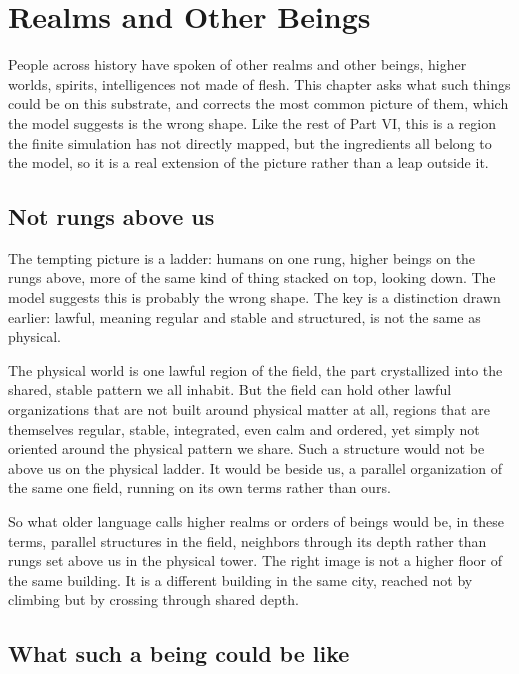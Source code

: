 \section{Realms and Other Beings}

People across history have spoken of other realms and other beings, higher worlds, spirits, intelligences not made of flesh. This chapter asks what such things could be on this substrate, and corrects the most common picture of them, which the model suggests is the wrong shape. Like the rest of Part VI, this is a region the finite simulation has not directly mapped, but the ingredients all belong to the model, so it is a real extension of the picture rather than a leap outside it.

\subsection{Not rungs above us}

The tempting picture is a ladder: humans on one rung, higher beings on the rungs above, more of the same kind of thing stacked on top, looking down. The model suggests this is probably the wrong shape. The key is a distinction drawn earlier: lawful, meaning regular and stable and structured, is not the same as physical.

The physical world is one lawful region of the field, the part crystallized into the shared, stable pattern we all inhabit. But the field can hold other lawful organizations that are not built around physical matter at all, regions that are themselves regular, stable, integrated, even calm and ordered, yet simply not oriented around the physical pattern we share. Such a structure would not be above us on the physical ladder. It would be beside us, a parallel organization of the same one field, running on its own terms rather than ours.

So what older language calls higher realms or orders of beings would be, in these terms, parallel structures in the field, neighbors through its depth rather than rungs set above us in the physical tower. The right image is not a higher floor of the same building. It is a different building in the same city, reached not by climbing but by crossing through shared depth.

\subsection{What such a being could be like}

